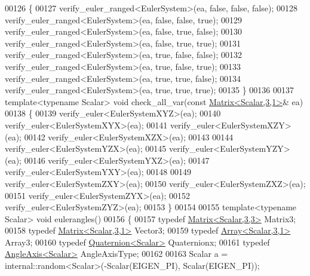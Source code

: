 \begin{DoxyCode}
00126 \{
00127   verify\_euler\_ranged<EulerSystem>(ea, \textcolor{keyword}{false}, \textcolor{keyword}{false}, \textcolor{keyword}{false});
00128   verify\_euler\_ranged<EulerSystem>(ea, \textcolor{keyword}{false}, \textcolor{keyword}{false}, \textcolor{keyword}{true});
00129   verify\_euler\_ranged<EulerSystem>(ea, \textcolor{keyword}{false}, \textcolor{keyword}{true}, \textcolor{keyword}{false});
00130   verify\_euler\_ranged<EulerSystem>(ea, \textcolor{keyword}{false}, \textcolor{keyword}{true}, \textcolor{keyword}{true});
00131   verify\_euler\_ranged<EulerSystem>(ea, \textcolor{keyword}{true}, \textcolor{keyword}{false}, \textcolor{keyword}{false});
00132   verify\_euler\_ranged<EulerSystem>(ea, \textcolor{keyword}{true}, \textcolor{keyword}{false}, \textcolor{keyword}{true});
00133   verify\_euler\_ranged<EulerSystem>(ea, \textcolor{keyword}{true}, \textcolor{keyword}{true}, \textcolor{keyword}{false});
00134   verify\_euler\_ranged<EulerSystem>(ea, \textcolor{keyword}{true}, \textcolor{keyword}{true}, \textcolor{keyword}{true});
00135 \}
00136 
00137 \textcolor{keyword}{template}<\textcolor{keyword}{typename} Scalar> \textcolor{keywordtype}{void} check\_all\_var(\textcolor{keyword}{const} \hyperlink{group___core___module}{Matrix<Scalar,3,1>}& ea)
00138 \{
00139   verify\_euler<EulerSystemXYZ>(ea);
00140   verify\_euler<EulerSystemXYX>(ea);
00141   verify\_euler<EulerSystemXZY>(ea);
00142   verify\_euler<EulerSystemXZX>(ea);
00143   
00144   verify\_euler<EulerSystemYZX>(ea);
00145   verify\_euler<EulerSystemYZY>(ea);
00146   verify\_euler<EulerSystemYXZ>(ea);
00147   verify\_euler<EulerSystemYXY>(ea);
00148   
00149   verify\_euler<EulerSystemZXY>(ea);
00150   verify\_euler<EulerSystemZXZ>(ea);
00151   verify\_euler<EulerSystemZYX>(ea);
00152   verify\_euler<EulerSystemZYZ>(ea);
00153 \}
00154 
00155 \textcolor{keyword}{template}<\textcolor{keyword}{typename} Scalar> \textcolor{keywordtype}{void} eulerangles()
00156 \{
00157   \textcolor{keyword}{typedef} \hyperlink{group___core___module_class_eigen_1_1_matrix}{Matrix<Scalar,3,3>} Matrix3;
00158   \textcolor{keyword}{typedef} \hyperlink{group___core___module}{Matrix<Scalar,3,1>} Vector3;
00159   \textcolor{keyword}{typedef} \hyperlink{group___core___module_class_eigen_1_1_array}{Array<Scalar,3,1>} Array3;
00160   \textcolor{keyword}{typedef} \hyperlink{group___geometry___module_class_eigen_1_1_quaternion}{Quaternion<Scalar>} Quaternionx;
00161   \textcolor{keyword}{typedef} \hyperlink{group___geometry___module_class_eigen_1_1_angle_axis}{AngleAxis<Scalar>} AngleAxisType;
00162 
00163   Scalar a = internal::random<Scalar>(-Scalar(EIGEN\_PI), Scalar(EIGEN\_PI));

\end{DoxyCode}
